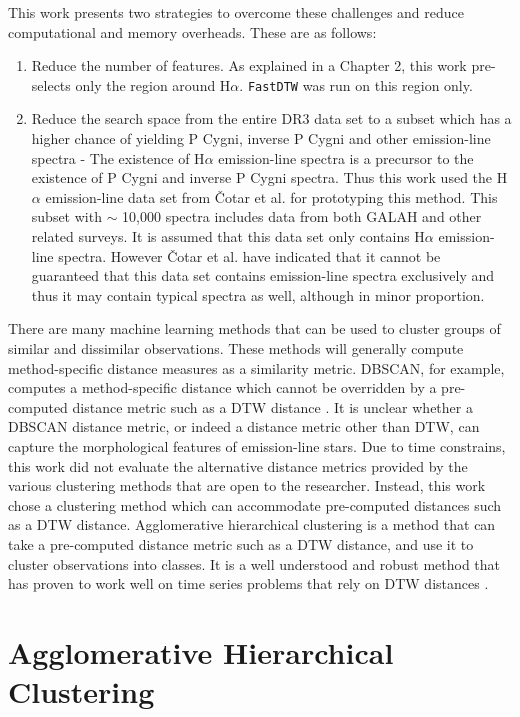 This work presents two strategies to overcome these challenges and reduce computational and memory overheads. These are as follows:

\begin{enumerate}
    \item Reduce the number of features. As explained in a Chapter 2, this work pre-selects only the region around H$\alpha$. \texttt{FastDTW} was run on this region only.
    \item Reduce the search space from the entire DR3 data set to a subset which has a higher chance of yielding P Cygni, inverse P Cygni and other emission-line spectra - The existence of H$\alpha$ emission-line spectra is a precursor to the existence of P Cygni and inverse P Cygni spectra. Thus this work used the H$\alpha$ emission-line data set from Čotar et al.\citep{vcotar2021galah} for prototyping this method. This subset with $\sim$ 10,000 spectra includes data from both GALAH and other related surveys. It is assumed that this data set only contains H$\alpha$ emission-line spectra. However  Čotar et al. have indicated that it cannot be guaranteed that this data set contains emission-line spectra exclusively and thus it may contain typical spectra as well, although in minor proportion. 
\end{enumerate}

There are many machine learning methods that can be used to cluster groups of similar and dissimilar observations. These methods will generally compute method-specific distance measures as a similarity metric. DBSCAN, for example, computes a method-specific distance which cannot be overridden by a pre-computed distance metric such as a DTW distance \citep{traven2017galah}. It is unclear whether a DBSCAN distance metric, or indeed a distance metric other than DTW, can capture the morphological features of emission-line stars. Due to time constrains, this work did not evaluate the alternative distance metrics provided by the various clustering methods that are open to the researcher. Instead, this work chose a clustering method which can accommodate pre-computed distances such as a DTW distance. Agglomerative hierarchical clustering is a method that can take a pre-computed distance metric such as a DTW distance, and use it to cluster observations into classes. It is a well understood and robust method that has proven to work well on time series problems that rely on DTW distances \citep{nielsen2019practical}.

\section{Agglomerative Hierarchical Clustering}

